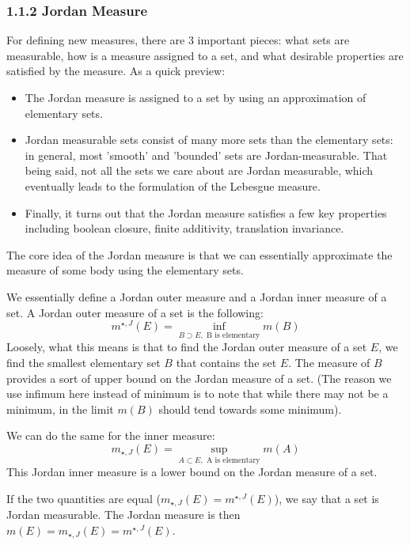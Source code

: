 \documentclass[answers,12pt]{exam}
\begin{document}
\subsubsection{1.1.2 Jordan Measure}
For defining new measures, there are 3 important pieces: what sets are measurable, how is a measure assigned to a set, and what desirable properties are satisfied by the measure.
As a quick preview:
\begin{itemize}
    \item The Jordan measure is assigned to a set by using an approximation of elementary sets.
    \item Jordan measurable sets consist of many more sets than the elementary sets: 
    in general, most 'smooth' and 'bounded' sets are Jordan-measurable.
    That being said, not all the sets we care about are Jordan measurable, which eventually leads to the formulation of the Lebesgue measure.
    \item Finally, it turns out that the Jordan measure satisfies a few key properties including boolean closure, finite additivity, translation invariance.

\end{itemize}
The core idea of the Jordan measure is that we can essentially approximate the measure of some body using the elementary sets.

We essentially define a Jordan outer measure and a Jordan inner measure of a set.
A Jordan outer measure of a set is the following: 
\[
    m^{\star, J}(E) = \inf_{B \supset E, \text{ B is elementary}} m(B)
\]
Loosely, what this means is that to find the Jordan outer measure of a set $E$, we find the smallest elementary set $B$ that contains the set $E$.
The measure of $B$ provides a sort of upper bound on the Jordan measure of a set.
(The reason we use infimum here instead of minimum is to note that while there may not be a minimum, in the limit $m(B)$ should tend towards some minimum).

We can do the same for the inner measure:
\[
    m_{\star, J}(E) = \sup_{A \subset E, \text{ A is elementary}} m(A)
\]
This Jordan inner measure is a lower bound on the Jordan measure of a set.

If the two quantities are equal ($m_{\star, J}(E) = m^{\star, J}(E)$), we say that a set is Jordan measurable.
The Jordan measure is then $m(E) = m_{\star, J}(E) = m^{\star, J}(E)$.
\end{document}
